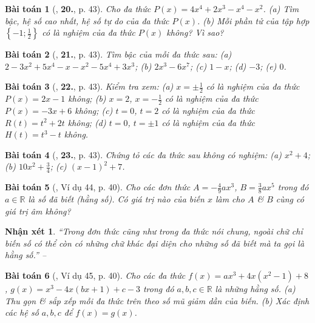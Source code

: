\documentclass{article}
\numberwithin{equation}{section}
\newtheorem{baitoan}{Bài toán}
\newtheorem{nhanxet}{Nhận xét}[section]
\begin{document}
\begin{baitoan}[\cite{SBT_Toan_7_Canh_Dieu_tap_2}, \textbf{20.}, p. 43]
	Cho đa thức $P(x) = 4x^4 + 2x^3 - x^4 - x^2$. (a) Tìm bậc, hệ số cao nhất, hệ số tự do của đa thức $P(x)$. (b) Mỗi phần tử của tập hợp $\left\{-1;\frac{1}{2}\right\}$ có là nghiệm của đa thức $P(x)$ không? Vì sao?
\end{baitoan}

\begin{baitoan}[\cite{SBT_Toan_7_Canh_Dieu_tap_2}, \textbf{21.}, p. 43]
	Tìm bậc của mỗi đa thức sau: (a) $2 - 3x^2 + 5x^4 - x - x^2 - 5x^4 + 3x^3$; (b) $2x^3 - 6x^7$; (c) $1 - x$; (d) $-3$; (e) $0$.
\end{baitoan}

\begin{baitoan}[\cite{SBT_Toan_7_Canh_Dieu_tap_2}, \textbf{22.}, p. 43]
	Kiểm tra xem: (a) $x = \pm\frac{1}{2}$ có là nghiệm của đa thức $P(x) = 2x - 1$ không; (b) $x = 2$, $x = -\frac{1}{2}$ có là nghiệm của đa thức $P(x) = -3x + 6$ không; (c) $t = 0$, $t = 2$ có là nghiệm của đa thức $R(t) = t^2 + 2t$ không; (d) $t = 0$, $t = \pm1$ có là nghiệm của đa thức $H(t) = t^3 - t$ không.
\end{baitoan}

\begin{baitoan}[\cite{SBT_Toan_7_Canh_Dieu_tap_2}, \textbf{23.}, p. 43]
	Chứng tỏ các đa thức sau không có nghiệm: (a) $x^2 + 4$; (b) $10x^2 + \frac{3}{4}$; (c) $(x - 1)^2 + 7$.
\end{baitoan}

\begin{baitoan}[\cite{Tuyen_Toan_7}, Ví dụ 44, p. 40]
	Cho các đơn thức $A = -\frac{4}{9}ax^3$, $B = \frac{3}{8}ax^5$ trong đó $a\in\mathbb{R}$ là số đã biết (hằng số). Có giá trị nào của biến $x$ làm cho $A$ \& $B$ cùng có giá trị âm không?
\end{baitoan}

\begin{nhanxet}
	``Trong đơn thức cũng như trong đa thức nói chung, ngoài chữ chỉ biến số có thể còn có những chữ khác đại diện cho những số đã biết mà ta gọi là \emph{hằng số}.'' -- \cite[p. 40]{Tuyen_Toan_7}
\end{nhanxet}

\begin{baitoan}[\cite{Tuyen_Toan_7}, Ví dụ 45, p. 40]
	Cho các đa thức $f(x) = ax^3 + 4x(x^2 - 1) + 8$, $g(x) = x^3 - 4x(bx + 1) + c - 3$ trong đó $a,b,c\in\mathbb{R}$ là những hằng số. (a) Thu gọn \& sắp xếp mỗi đa  thức trên theo số mũ giảm dần của biến. (b) Xác định các hệ số $a,b,c$ để $f(x) = g(x)$.
\end{baitoan}
\end{document}
